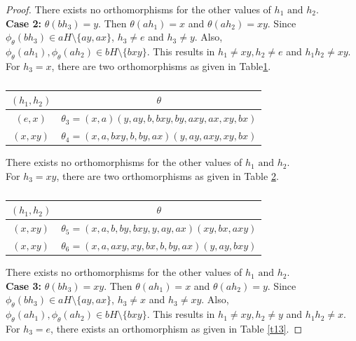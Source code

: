 \documentclass[11pt,a4paper]{article}
\theoremstyle{definition}
\theoremstyle{remark}
\begin{document}
\begin{proof}
\begin{table}[H]
	\end{table}
	\vspace{-.7cm}
	There exists no orthomorphisms for the other values of $h_{1} \text{ and } h_{2}$.\\
	\textbf{Case 2:}   $\theta(bh_{3}) = y.$ Then $\theta(ah_{1}) = x$ and $\theta(ah_{2}) = xy$. Since $\phi_{\theta}(bh_{3}) \in aH \setminus \{ay,ax\}$,  $h_{3} \neq e$ and $h_{3} \neq y$. Also, $\phi_{\theta}(ah_{1}), \phi_{\theta}(ah_{2}) \in bH\setminus\{bxy
	\}.$ This results in $h_{1} \neq xy, h_{2} \neq e$ and $h_{1}h_{2} \neq xy$. For $h_{3} = x$, there are two orthomorphisms as given in Table\ref{t11}.
	\begin{table}[H]
	\begin{center}
			\begin{tabular}{|c|c|}
			\hline
			$(h_{1},h_{2})$ & $\theta$\\ \hline
			$(e,x)$ &  $\theta_{3} = (x,a)(y,ay,b,bxy,by,axy,ax,xy,bx)$ \\ \hline
			$(x,xy)$ & $\theta_{4} = (x,a,bxy,b,by,ax)(y,ay,axy,xy,bx)$\\ \hline
		\end{tabular}\caption{} \label{t11}
	\end{center}
	\end{table}
	\vspace{-.7cm}
			There exists no orthomorphisms for the other values of $h_{1} \text{ and } h_{2}$.\\
	For $h_{3} = xy$, there are two orthomorphisms as given in Table \ref{t12}.
	\begin{table}[H]
	\begin{center}
			\begin{tabular}{|c|c|}
			\hline
			$(h_{1},h_{2})$ & $\theta$\\ \hline
			$(x,xy)$ &  $\theta_{5} = (x,a,b,by,bxy,y,ay,ax)(xy,bx,axy)$ \\ \hline
			$(x,xy)$ & $\theta_{6} = (x,a,axy,xy,bx,b,by,ax)(y,ay,bxy)$\\ \hline
		\end{tabular} \caption{} \label{t12}
	\end{center}
	\end{table}
	\vspace{-.7cm}
			There exists no orthomorphisms for the other values of $h_{1} \text{ and } h_{2}$.\\
	\textbf{Case 3:}  $\theta(bh_{3}) = xy.$ Then $\theta(ah_{1}) = x$ and $\theta(ah_{2}) = y$.  Since $\phi_{\theta}(bh_{3}) \in aH \setminus \{ay,ax\}$, $h_{3} \neq x$ and $h_{3} \neq xy$. Also, $\phi_{\theta}(ah_{1}), \phi_{\theta}(ah_{2}) \in bH\setminus\{bxy\}.$ This results in $h_{1} \neq xy, h_{2} \neq y$ and $h_{1}h_{2} \neq x$. For $h_{3} = e$, there exists an orthomorphism as given in Table \ref{t13}.

\end{proof}
\end{document}
